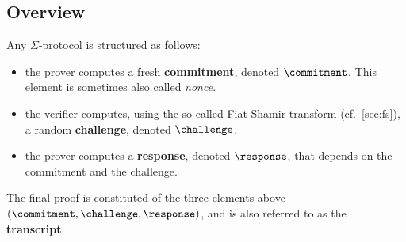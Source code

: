 \documentclass[11pt]{article}
\begin{document}


\subsection{Overview}
Any $\Sigma$-protocol is structured as follows:
\begin{itemize}
  \item the prover computes a fresh \textbf{commitment}, denoted $\commitment$. This element is sometimes also called \emph{nonce}.
  \item the verifier computes, using the so-called Fiat-Shamir transform (cf.~\cref{sec:fs}), a random \textbf{challenge}, denoted $\challenge$.
  \item the prover computes a \textbf{response}, denoted $\response$, that depends on the commitment and the challenge.
\end{itemize}
The final proof is constituted of the three-elements above $(\commitment, \challenge, \response)$, and is also referred to as the \textbf{transcript}.
\end{document}
